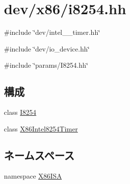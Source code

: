 \hypertarget{i8254_8hh}{
\section{dev/x86/i8254.hh}
\label{i8254_8hh}
}
{\ttfamily \#include \char`\"{}dev/intel\_\_\-timer.hh\char`\"{}}\par
{\ttfamily \#include \char`\"{}dev/io\_\-device.hh\char`\"{}}\par
{\ttfamily \#include \char`\"{}params/I8254.hh\char`\"{}}\par
\subsection*{構成}
\begin{DoxyCompactItemize}
\item 
class \hyperlink{classX86ISA_1_1I8254}{I8254}
\item 
class \hyperlink{classX86ISA_1_1I8254_1_1X86Intel8254Timer}{X86Intel8254Timer}
\end{DoxyCompactItemize}
\subsection*{ネームスペース}
\begin{DoxyCompactItemize}
\item 
namespace \hyperlink{namespaceX86ISA}{X86ISA}
\end{DoxyCompactItemize}
